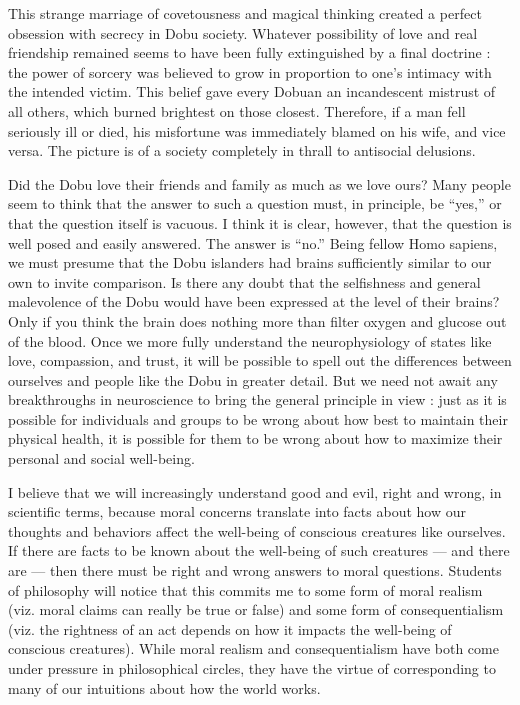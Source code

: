 \documentclass[a4paper,14pt]{extarticle}
\begin{document}
This strange marriage of covetousness and magical thinking created a perfect obsession with secrecy in Dobu society.
Whatever possibility of love and real friendship remained seems to have been fully extinguished by a final doctrine :
the power of sorcery was believed to grow in proportion to one's intimacy with the intended victim.
This belief gave every Dobuan an incandescent mistrust of all others, which burned brightest on those closest.
Therefore, if a man fell seriously ill or died, his misfortune was immediately blamed on his wife, and vice versa.
The picture is of a society completely in thrall to antisocial delusions.

Did the Dobu love their friends and family as much as we love ours?
Many people seem to think that the answer to such a question must, in principle, be ``yes,'' or that the question itself is vacuous.
I think it is clear, however, that the question is well posed and easily answered.
The answer is ``no.''
Being fellow Homo sapiens, we must presume that the Dobu islanders had brains sufficiently similar to our own to invite comparison.
Is there any doubt that the selfishness and general malevolence of the Dobu would have been expressed at the level of their brains?
Only if you think the brain does nothing more than filter oxygen and glucose out of the blood.
Once we more fully understand the neurophysiology of states like love, compassion, and trust, it will be possible to spell out the differences between ourselves and people like the Dobu in greater detail.
But we need not await any breakthroughs in neuroscience to bring the general principle in view :
just as it is possible for individuals and groups to be wrong about how best to maintain their physical health, it is possible for them to be wrong about how to maximize their personal and social well-being.

I believe that we will increasingly understand good and evil, right and wrong, in scientific terms, because moral concerns translate into facts about how our thoughts and behaviors affect the well-being of conscious creatures like ourselves.
If there are facts to be known about the well-being of such creatures --- and there are --- then there must be right and wrong answers to moral questions.
Students of philosophy will notice that this commits me to some form of moral realism (viz. moral claims can really be true or false) and some form of consequentialism (viz. the rightness of an act depends on how it impacts the well-being of conscious creatures).
While moral realism and consequentialism have both come under pressure in philosophical circles, they have the virtue of corresponding to many of our intuitions about how the world works.
\end{document}
